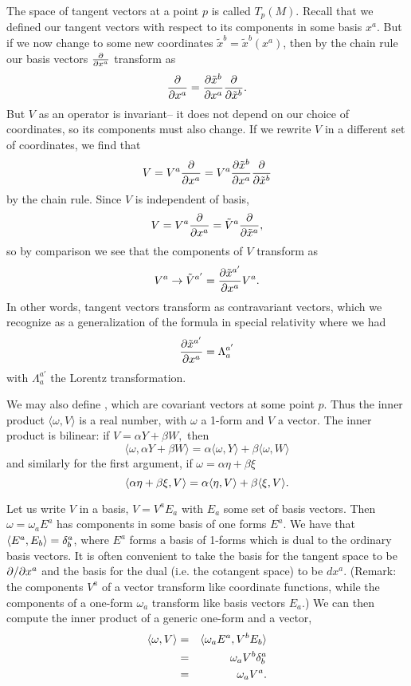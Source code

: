 The space of tangent vectors at a point $p$ is called $T_p(M)$. Recall that we defined our tangent vectors with respect to its components in some basis $x^a$. But if we now change to some new coordinates $\tilde x^b = \tilde x^b(x^a)$, then by the chain rule our basis vectors $\P{}{x^a}$ transform as
$$\P{}{x^a}=\P{\tilde x^{b}}{x^a}\frac{\partial}{\partial \tilde x^b}.$$
But $V$ as an operator is invariant-- it does not depend on our choice of coordinates, so its components must also change. If we rewrite $V$ in a different set of coordinates, we find that
$$V=V^a \P{}{x^a} = V^a \P{\tilde x^b}{x^a}\frac{\p}{\p\tilde x^b}$$
by the chain rule. Since $V$ is independent of basis,
$$V=V^a \P{}{x^a}= \tilde V^a \P{}{\tilde x^a},$$ so by comparison we see that the components of $V$ transform as
$$V^a\to \tilde V^{a'} = \frac{\p\tilde x^{a'}}{\p x^a} V^a.$$
In other words, tangent vectors transform as contravariant vectors, which we recognize as a generalization of the formula in special relativity where we had $$\P{\tilde x^{a'}}{x^a}=\Lambda^{a'}_{a}$$
with $\Lambda^{a'}_{a}$ the Lorentz transformation.

\begin{defn}
We may also define , which are covariant vectors at some point $p$. Thus the inner product $\langle \omega, V\rangle$ is a real number, with $\omega$ a 1-form and $V$ a vector. The inner product is bilinear:
if $V=\alpha Y + \beta W,$ then
$$\langle \omega, \alpha Y + \beta W\rangle = \alpha\langle \omega, Y\rangle +\beta \langle \omega, W\rangle$$
and similarly for the first argument, if $\omega = \alpha \eta+\beta \xi$
$$\ang{\alpha \eta +\beta\xi, V} = \alpha \ang{\eta, V} +\beta \ang{\xi, V}.$$
\end{defn}

Let us write $V$ in a basis, $V=V^a E_a$ with $E_a$ some set of basis vectors. Then $\omega= \omega_a E^a$ has components in some basis of one forms $E^a$. We have that $\ang{E^a, E_b}=\delta^a_b$, where $E^a$ forms a basis of 1-forms which is dual to the ordinary basis vectors. It is often convenient to take the basis for the tangent space to be $\p/\p x^a$ and the basis for the dual (i.e. the cotangent space) to be $dx^a$. (Remark: the components $V^a$ of a vector transform like coordinate functions, while the components of a one-form $\omega_a$ transform like basis vectors $E_a$.) We can then compute the inner product of a generic one-form and a vector, %
\begin{eqnarray*}
\ang{\omega,V}&=&\ang{\omega_a E^a, V^b E_b}\\
&=& \omega_a V^b \delta^a_b\\
&=& \omega_a V^a.
\end{eqnarray*}